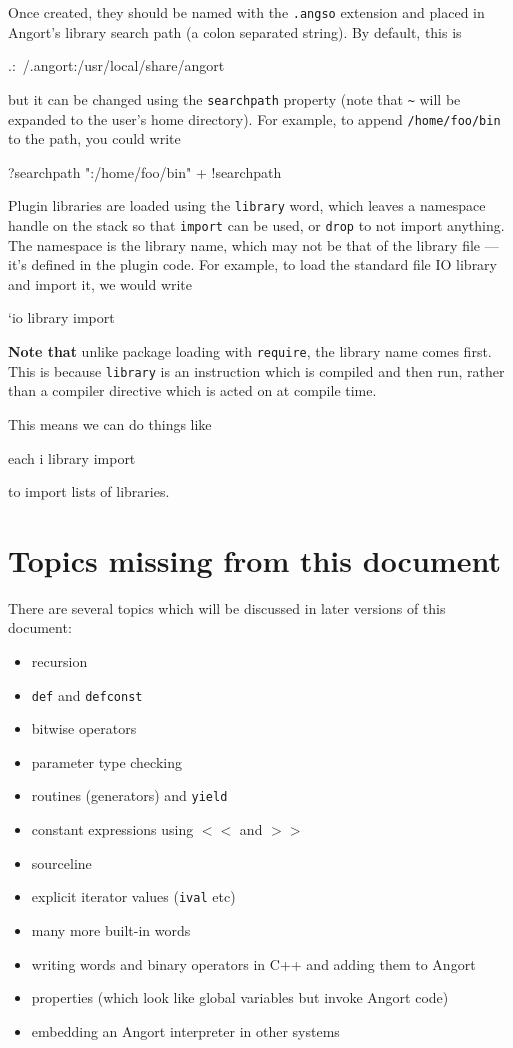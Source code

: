 Once created, they should be named with the \texttt{.angso} extension
and placed in Angort's library search path (a colon separated string).
By default, this is 
\begin{v}
.:~/.angort:/usr/local/share/angort
\end{v}
but it can be changed using the 
\texttt{searchpath} property (note that \verb+~+ will be expanded
to the user's home directory). For example, to append \texttt{/home/foo/bin}
to the path, you could write
\begin{v}
?searchpath ":/home/foo/bin" + !searchpath
\end{v}
Plugin libraries are loaded using the \texttt{library} word, which
leaves a namespace handle on the stack so that \texttt{import} can be
used, or \texttt{drop} to not import anything. The namespace is
the library name, which may not be that of the library file --- it's defined
in the plugin code. For example, to load the standard file IO library
and import it, we would write
\begin{v}
`io library import
\end{v}
\textbf{Note that} unlike package loading with \texttt{require},
the library name comes first.
This is because \texttt{library} is an instruction which is compiled and
then run, rather than a compiler directive which is acted on
at compile time.

This means we can do things like
\begin{v}
[`id3, `mpc, `io] each {i library import}
\end{v}
to import lists of libraries.

\section{Topics missing from this document}
There are several topics which will be discussed in later versions
of this document:
\begin{itemize}
\item recursion
\item \texttt{def} and \texttt{defconst}
\item bitwise operators
\item parameter type checking
\item routines (generators) and \texttt{yield}
\item constant expressions using $<<$ and $>>$
\item sourceline
\item explicit iterator values (\texttt{ival} etc)
\item many more built-in words
\item writing words and binary operators in C++ and adding them to Angort
\item properties (which look like global variables but invoke Angort code)
\item embedding an Angort interpreter in other systems
\end{itemize}




